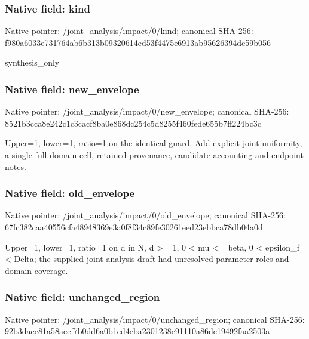 \documentclass[10pt,a4paper]{article}
\begin{document}
\subsubsection{Native field: kind}
Native pointer: /joint\_\allowbreak{}analysis/impact/0/kind; canonical SHA-256: f980a6033e731764ab6b313b09320614ed53f4475e6913ab95626394dc59b056

\begingroup\raggedright\sloppy synthesis\_\allowbreak{}only\par\endgroup

\subsubsection{Native field: new\_\allowbreak{}envelope}
Native pointer: /joint\_\allowbreak{}analysis/impact/0/new\_\allowbreak{}envelope; canonical SHA-256: 8521b3cca8e242c1c3cacf8ba0e868dc254c5d8255f460fede655b7ff224bc3c

\begingroup\raggedright\sloppy Upper=\allowbreak{}1,\allowbreak{} lower=\allowbreak{}1,\allowbreak{} ratio=\allowbreak{}1 on the identical guard. Add explicit joint uniformity,\allowbreak{} a single full-domain cell,\allowbreak{} retained provenance,\allowbreak{} candidate accounting and endpoint notes.\par\endgroup

\subsubsection{Native field: old\_\allowbreak{}envelope}
Native pointer: /joint\_\allowbreak{}analysis/impact/0/old\_\allowbreak{}envelope; canonical SHA-256: 67fc382caa40556cfa48948369e3a0f8f34c89fe30261eed23ebbca78db04a0d

\begingroup\raggedright\sloppy Upper=\allowbreak{}1,\allowbreak{} lower=\allowbreak{}1,\allowbreak{} ratio=\allowbreak{}1 on d in N,\allowbreak{} d >=\allowbreak{} 1,\allowbreak{} 0 < mu <=\allowbreak{} beta,\allowbreak{} 0 < epsilon\_\allowbreak{}f < Delta;\allowbreak{} the supplied joint-analysis draft had unresolved parameter roles and domain coverage.\par\endgroup

\subsubsection{Native field: unchanged\_\allowbreak{}region}
Native pointer: /joint\_\allowbreak{}analysis/impact/0/unchanged\_\allowbreak{}region; canonical SHA-256: 92b3daee81a58aeef7b0dd6a0b1cd4eba2301238e91110a86dc19492faa2503a
\end{document}
